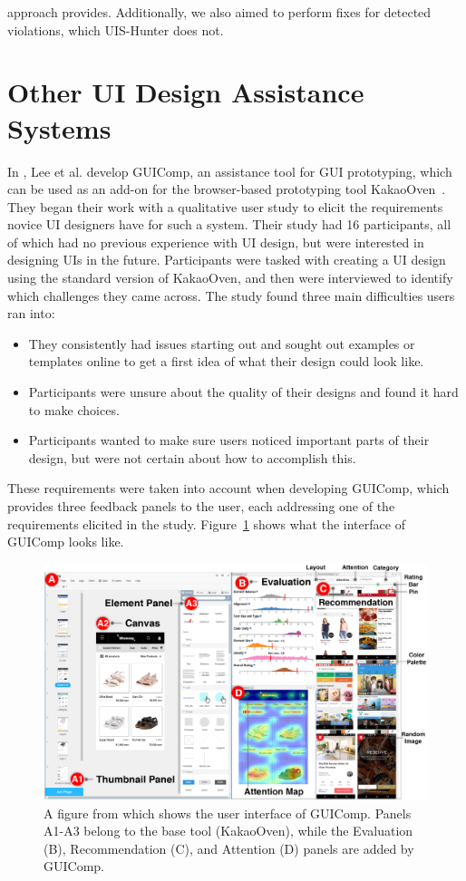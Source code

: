 \documentclass[11pt,titlepage,oneside,openany]{book}
\begin{document}
approach provides. Additionally, we also aimed to perform fixes for detected violations, which UIS-Hunter does not. 

\section{Other UI Design Assistance Systems}\label{sec:assist}

In \cite{lee_guicomp_2020}, Lee et al. develop GUIComp, an assistance tool for GUI prototyping, which can be used as an add-on for the browser-based prototyping tool KakaoOven~\cite{oven_corp_ovenappio_2024}. They began their work with a qualitative user study to elicit the requirements novice UI designers have for such a system. Their study had 16 participants, all of which had no previous experience with UI design, but were interested in designing UIs in the future. Participants were tasked with creating a UI design using the standard version of KakaoOven, and then were interviewed to identify which challenges they came across. The study found three main difficulties users ran into: 
\begin{itemize}
	\item They consistently had issues starting out and sought out examples or templates online to get a first idea of what their design could look like.
	\item Participants were unsure about the quality of their designs and found it hard to make choices.
	\item Participants wanted to make sure users noticed important parts of their design, but were not certain about how to accomplish this.
\end{itemize}
These requirements were taken into account when developing GUIComp, which provides three feedback panels to the user, each addressing one of the requirements elicited in the study. Figure~\ref{fig:guicomp} shows what the interface of GUIComp looks like.

\begin{figure}
	\centering
	\includegraphics[width=\textwidth]{figures/GUIComp.png}
	\caption{A figure from \cite{lee_guicomp_2020} which shows the user interface of GUIComp. Panels A1-A3 belong to the base tool (KakaoOven), while the Evaluation (B), Recommendation (C), and Attention (D) panels are added by GUIComp.}
	\label{fig:guicomp}
\end{figure}
\end{document}
